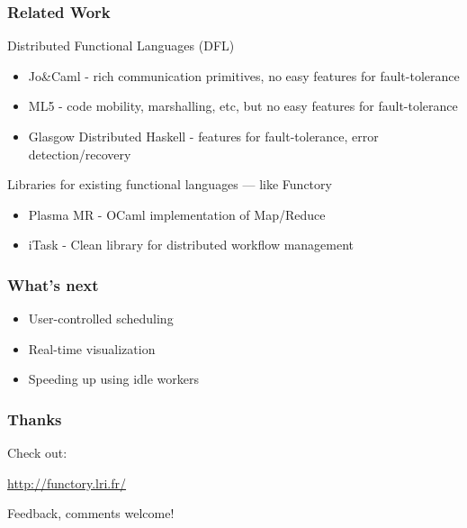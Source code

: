 \documentclass[xcolor=dvipsnames]{beamer}
\begin{document}
\begin{frame}\frametitle {Related Work}
  Distributed Functional Languages (DFL)
  \begin{itemize}
  \item Jo\&Caml - rich communication primitives, no easy features
    for fault-tolerance
  \item ML5 - code mobility, marshalling, etc, but no
    easy features for fault-tolerance
  \item Glasgow Distributed Haskell - features for fault-tolerance,
    error detection/recovery
  \end{itemize}


  Libraries for existing functional languages --- like Functory
  \begin{itemize}
  \item Plasma MR - OCaml implementation of Map/Reduce
  \item iTask - Clean library for distributed workflow management
  \end{itemize}

  
\end{frame}


\begin{frame}\frametitle {What's next}
  \begin{itemize}
  \item User-controlled scheduling
  \item Real-time visualization 
  \item Speeding up using idle workers
  \end{itemize}
\end{frame}


\begin{frame}\frametitle {Thanks}


Check out:
\begin{center}
 \textcolor{blue}{\url{http://functory.lri.fr/}}  
\end{center}

Feedback, comments welcome!

\end{frame}

\end{document}
